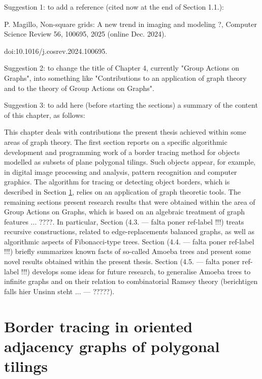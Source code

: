 

%

\noindent Suggestion 1: to add a reference (cited now at the end of Section 1.1.):

 P. Magillo, Non-square grids: A new trend in imaging and modeling ?, Computer Science Review 56, 100695, 2025 (online Dec. 2024). 

doi:10.1016/j.cosrev.2024.100695.


\vskip0.5cm
\noindent Suggestion 2: to change the title of Chapter 4, currently "Group Actions on Graphs", into something like "Contributions to an application of graph theory and to the theory of Group Actions on Graphs".

\vskip0.5cm
\noindent Suggestion 3: to add here (before starting the sections) a summary of the content of this chapter, as follows:
\vskip0.5cm

\noindent This chapter deals with contributions the present thesis achieved within some areas of graph theory. The first section reports on a specific algorithmic development and programming work of a border tracing method for objects modelled as subsets of plane polygonal tilings. Such objects appear, for example, in digital image processing and analysis, pattern recognition and computer graphics. The algorithm for tracing or detecting object borders, which is described in Section \ref{sec:border_tracing}, relies on an application of graph theoretic tools. The remaining sections present research results that were obtained within the area of Group Actions on Graphs, which is based on an algebraic treatment of graph features ... ????. In particular, Section (4.3. --- falta poner ref-label !!!) treats recursive constructions, related to edge-replacements balanced graphs, as well as algorithmic aspects of Fibonacci-type trees. Section (4.4. --- falta poner ref-label !!!) briefly summarizes known facts of so-called Amoeba trees and present some novel results obtained within the present thesis. Section (4.5. --- falta poner ref-label !!!) develops some ideas for future research, to generalise Amoeba trees to infinite graphs and on their relation to combinatorial Ramsey theory (berichtigen falls hier Unsinn steht ... --- ?????).


\section{Border tracing in oriented adjacency graphs of polygonal tilings}\label{sec:border_tracing}

